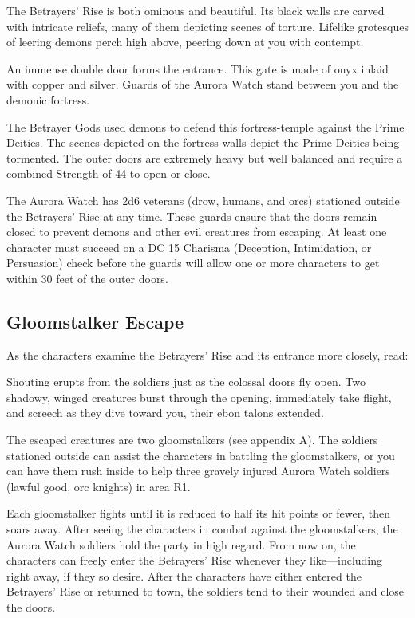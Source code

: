 \documentclass[10pt,a4paper,twoside,fancy,bg=print,twocolumn,openany,nodeprecatedcode]{dndbook}
\begin{document}
\begin{DndReadAloud}{}
The Betrayers' Rise is both ominous and beautiful. Its black walls are carved with intricate reliefs, many of them depicting scenes of torture. Lifelike grotesques of leering demons perch high above, peering down at you with contempt.

An immense double door forms the entrance. This gate is made of onyx inlaid with copper and silver. Guards of the Aurora Watch stand between you and the demonic fortress.

\end{DndReadAloud}

The Betrayer Gods used demons to defend this fortress-temple against the Prime Deities. The scenes depicted on the fortress walls depict the Prime Deities being tormented. The outer doors are extremely heavy but well balanced and require a combined Strength of 44 to open or close.

The Aurora Watch has 2d6 veterans (drow, humans, and orcs) stationed outside the Betrayers' Rise at any time. These guards ensure that the doors remain closed to prevent demons and other evil creatures from escaping. At least one character must succeed on a DC 15 Charisma (Deception, Intimidation, or Persuasion) check before the guards will allow one or more characters to get within 30 feet of the outer doors.

\subsection{Gloomstalker Escape}
As the characters examine the Betrayers' Rise and its entrance more closely, read:

\begin{DndReadAloud}{}
Shouting erupts from the soldiers just as the colossal doors fly open. Two shadowy, winged creatures burst through the opening, immediately take flight, and screech as they dive toward you, their ebon talons extended.

\end{DndReadAloud}

The escaped creatures are two gloomstalkers (see appendix A). The soldiers stationed outside can assist the characters in battling the gloomstalkers, or you can have them rush inside to help three gravely injured Aurora Watch soldiers (lawful good, orc knights) in area R1.

Each gloomstalker fights until it is reduced to half its hit points or fewer, then soars away. After seeing the characters in combat against the gloomstalkers, the Aurora Watch soldiers hold the party in high regard. From now on, the characters can freely enter the Betrayers' Rise whenever they like—including right away, if they so desire. After the characters have either entered the Betrayers' Rise or returned to town, the soldiers tend to their wounded and close the doors.
\end{document}
